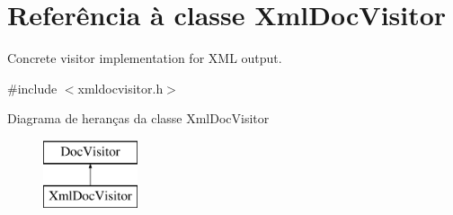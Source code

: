 \hypertarget{class_xml_doc_visitor}{\section{Referência à classe Xml\-Doc\-Visitor}
\label{class_xml_doc_visitor}
}


Concrete visitor implementation for X\-M\-L output.  




{\ttfamily \#include $<$xmldocvisitor.\-h$>$}

Diagrama de heranças da classe Xml\-Doc\-Visitor\begin{figure}[H]
\begin{center}
\leavevmode
\includegraphics[height=2.000000cm]{class_xml_doc_visitor}
\end{center}
\end{figure}
